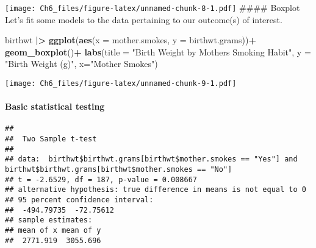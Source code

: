 \documentclass[
]{article}
\newenvironment{Shaded}{\begin{snugshade}}{\end{snugshade}}
\newcommand{\AttributeTok}[1]{\textcolor[rgb]{0.13,0.29,0.53}{#1}}
\newcommand{\FunctionTok}[1]{\textcolor[rgb]{0.13,0.29,0.53}{\textbf{#1}}}
\newcommand{\NormalTok}[1]{#1}
\newcommand{\SpecialCharTok}[1]{\textcolor[rgb]{0.81,0.36,0.00}{\textbf{#1}}}
\newcommand{\StringTok}[1]{\textcolor[rgb]{0.31,0.60,0.02}{#1}}
\begin{document}
\texttt{[image: Ch6\_files/figure-latex/unnamed-chunk-8-1.pdf]} \#\#\#\#
Boxplot Let's fit some models to the data pertaining to our outcome(s)
of interest.

\begin{Shaded}
\begin{Highlighting}[]
\NormalTok{birthwt }\SpecialCharTok{|\textgreater{}} \FunctionTok{ggplot}\NormalTok{(}\FunctionTok{aes}\NormalTok{(}\AttributeTok{x =}\NormalTok{ mother.smokes, }\AttributeTok{y =}\NormalTok{ birthwt.grams))}\SpecialCharTok{+}  
  \FunctionTok{geom\_boxplot}\NormalTok{()}\SpecialCharTok{+}
  \FunctionTok{labs}\NormalTok{(}\AttributeTok{title =} \StringTok{"Birth Weight by Mother\textquotesingle{}s Smoking Habit"}\NormalTok{, }\AttributeTok{y =} \StringTok{"Birth Weight (g)"}\NormalTok{, }\AttributeTok{x=}\StringTok{"Mother Smokes"}\NormalTok{)}
\end{Highlighting}
\end{Shaded}

\texttt{[image: Ch6\_files/figure-latex/unnamed-chunk-9-1.pdf]}

\paragraph{Basic statistical testing}\label{basic-statistical-testing}

\begin{Shaded}
\end{Shaded}

\begin{verbatim}
## 
##  Two Sample t-test
## 
## data:  birthwt$birthwt.grams[birthwt$mother.smokes == "Yes"] and birthwt$birthwt.grams[birthwt$mother.smokes == "No"]
## t = -2.6529, df = 187, p-value = 0.008667
## alternative hypothesis: true difference in means is not equal to 0
## 95 percent confidence interval:
##  -494.79735  -72.75612
## sample estimates:
## mean of x mean of y 
##  2771.919  3055.696
\end{verbatim}
\end{document}
